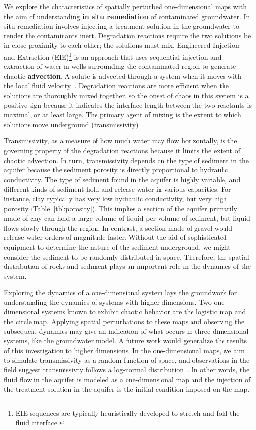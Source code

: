 We explore the characteristics of spatially perturbed one-dimensional
maps with the aim of understanding \textbf{in situ remediation} of contaminated
groundwater. In situ remediation involves injecting a treatment
solution in the groundwater to render the contaminants
inert. Degradation reactions require the two solutions be in close
proximity to each other; the solutions must mix. Engineered Injection
and Extraction (EIE)\footnote{EIE sequences are typically
  heuristically developed to stretch and fold the fluid interface.} is an
approach that uses sequential injection and extraction of water in wells surrounding
the contaminated region to generate chaotic \textbf{advection}. A
solute is advected through a system when it moves with the local fluid
velocity~\cite{advection}. Degradation reactions are more efficient when the solutions are thoroughly mixed
together, so the onset of chaos in this system is a positive sign
because it indicates the interface length between the two reactants is
maximal, or at least large. The primary agent of mixing is the extent to which
solutions move underground (transmissivity)~\cite{neupauer}. 

Transmissivity, as a measure of how
much water may flow horizontally, is the governing property of the
degradation reactions because it limits the extent of chaotic advection. In turn, transmissivity depends on the type of sediment in
the aquifer because the sediment porosity is directly proportional to
hydraulic conductivity. The type of sediment found in the aquifer is
highly variable, and different kinds of sediment hold and release water in various capacities. For instance, clay typically has
very low hydraulic conductivity, but very high porosity (Table~\ref{tbl:porosity}). This
implies a section of the aquifer primarily made of clay can hold a
large volume of liquid per volume of sediment, but liquid flows slowly
through the region. In contrast, a section made of gravel would
release water orders of magnitude faster. Without the aid of sophisticated equipment to
determine the nature of the sediment underground, we might consider
the sediment to be randomly distributed in space. Therefore, the
spatial distribution of rocks and sediment plays an important role in the dynamics of the system. 

Exploring the dynamics of a one-dimensional system lays the groundwork
for understanding the dynamics of systems with higher dimensions. Two
one-dimensional systems known to exhibit chaotic behavior are the
logistic map and the circle map. Applying spatial perturbations to
these maps and observing the subsequent dynamics may give an
indication of what occurs in three-dimensional systems, like the
groundwater model. A future work would generalize the results of
this investigation to higher dimensions. In the one-dimensional maps,
we aim to simulate transmissivity as a random function of space, and
observations in the field suggest transmissivty follows a log-normal
distribution~\cite{gelhar}. In other words, the fluid flow in the aquifer is modeled
as a one-dimensional map and the injection of the treatment solution
in the aquifer is the initial condition imposed on the map.

